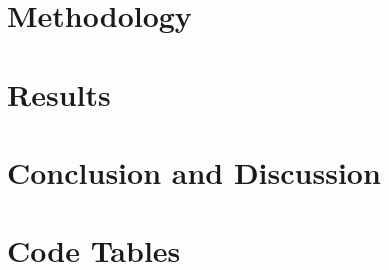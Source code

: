 \documentclass[11pt,leqno]{report}
\begin{document}
\chapter{Methodology}


\chapter{Results}


\chapter{Conclusion and Discussion}


\chapter{Code Tables}



%





\appendix
\end{document}
